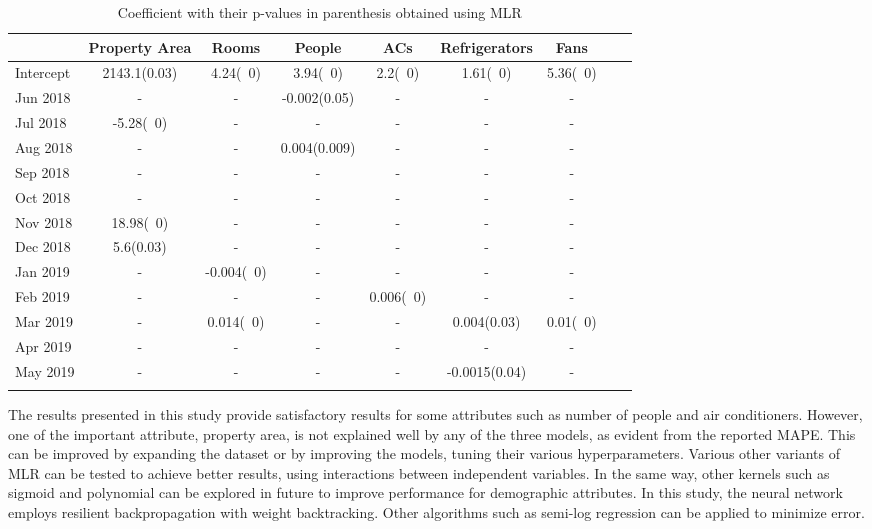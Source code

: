 \documentclass[conference]{IEEEtran}
\begin{document}
\begin{table*}[h]
\centering
\caption{Coefficient with their p-values in parenthesis obtained using MLR}
\begin{tabular}{lcccccccc}
  \hline
 & Property Area & Rooms & People & ACs & Refrigerators & Fans \\ 
  \hline
Intercept  & 2143.1(0.03) 	& 4.24(~0)     		& 3.94(~0)          & 2.2(~0)      	& 1.61(~0)  	& 5.36(~0)\\ 
  Jun 2018 & -      		& -			    	& -0.002(0.05)	    & -  			& -   			& -\\ 
  Jul 2018 & -5.28(~0) 		& -             	& -                 & -   			& -  			& -\\ 
  Aug 2018 & -			  	& -         		& 0.004(0.009)     	& - 			& -         	& - \\ 
  Sep 2018 & -      		& -         		& -                 & -     		& - 			& - \\ 
  Oct 2018 & -      		& -         		& -                 & -      		& -				& -\\ 
  Nov 2018 & 18.98(~0)  	& -         		& -                 & -  			& -     		& - \\ 
  Dec 2018 & 5.6(0.03)  	& -         		& -			     	& -			  	& -     		& -\\ 
  Jan 2019 & -			  	& -0.004(~0)   		& -			 		& -			  	& -     		& -\\ 
  Feb 2019 & -      		& -			    	& -                	& 0.006(~0) 	& -     		& -\\ 
  Mar 2019 & -  	    	& 0.014(~0)         & -                 & -     		& 0.004(0.03)	& 0.01(~0)\\ 
  Apr 2019 & - 	   	  		& -         		& -                 & -   			& -     		& - \\ 
  May 2019 & - 		     	& -				   	& -                 & -  			& -0.0015(0.04)	& - \\ 
   \hline
   \label{table: tablebetacoeffs}
\end{tabular}
\end{table*}


The results presented in this study provide satisfactory results for some attributes such as number of people and air conditioners. However, one of the important attribute, property area, is not explained well by any of the three models, as evident from the reported MAPE. This can be improved by expanding the dataset or by improving the models, tuning their various hyperparameters. Various other variants of MLR can be tested to achieve better results, using interactions between independent variables. In the same way, other kernels such as sigmoid and polynomial can be explored in future to improve performance for demographic attributes. In this study, the neural network employs resilient backpropagation with weight backtracking. Other algorithms such as semi-log regression can be applied to minimize error. 
\end{document}
